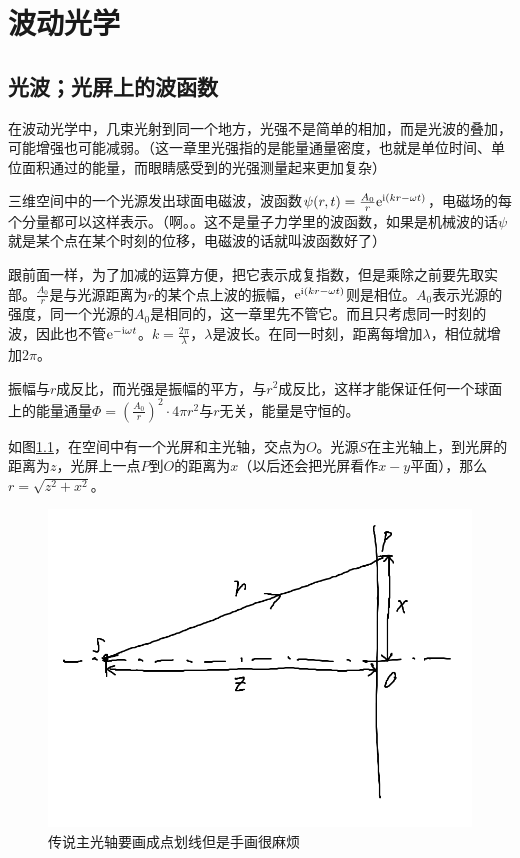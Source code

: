 \chapter{波动光学}
\section{光波；光屏上的波函数}
在波动光学中，几束光射到同一个地方，光强不是简单的相加，而是光波的叠加，可能增强也可能减弱。（这一章里光强指的是能量通量密度，也就是单位时间、单位面积通过的能量，而眼睛感受到的光强测量起来更加复杂）

三维空间中的一个光源发出球面电磁波，波函数$\psi(r,t)=\frac{A_0}{r} \mathrm{e}^{\mathrm{i}(k r-\omega t)}$，电磁场的每个分量都可以这样表示。（啊。。这不是量子力学里的波函数，如果是机械波的话$\psi$就是某个点在某个时刻的位移，电磁波的话就叫波函数好了）

跟前面一样，为了加减的运算方便，把它表示成复指数，但是乘除之前要先取实部。$\frac{A_0}{r}$是与光源距离为$r$的某个点上波的振幅，$\mathrm{e}^{\mathrm{i}(k r-\omega t)}$则是相位。$A_0$表示光源的强度，同一个光源的$A_0$是相同的，这一章里先不管它。而且只考虑同一时刻的波，因此也不管$\mathrm{e}^{-\mathrm{i} \omega t}$。$k=\frac{2 \pi}{\lambda}$，$\lambda$是波长。在同一时刻，距离每增加$\lambda$，相位就增加$2 \pi$。

振幅与$r$成反比，而光强是振幅的平方，与$r^2$成反比，这样才能保证任何一个球面上的能量通量$\Phi=(\frac{A_0}{r})^2 \cdot 4 \pi r^2$与$r$无关，能量是守恒的。

如图\ref{fig-wave-amp}，在空间中有一个光屏和主光轴，交点为$O$。光源$S$在主光轴上，到光屏的距离为$z$，光屏上一点$P$到$O$的距离为$x$（以后还会把光屏看作$x-y$平面），那么$r=\sqrt{z^2+x^2}$。
\begin{figure}[htb]
\centering
\includegraphics[scale=0.5]{fig/wave-amp.png}
\caption{传说主光轴要画成点划线但是手画很麻烦}
\label{fig-wave-amp}
\end{figure}

